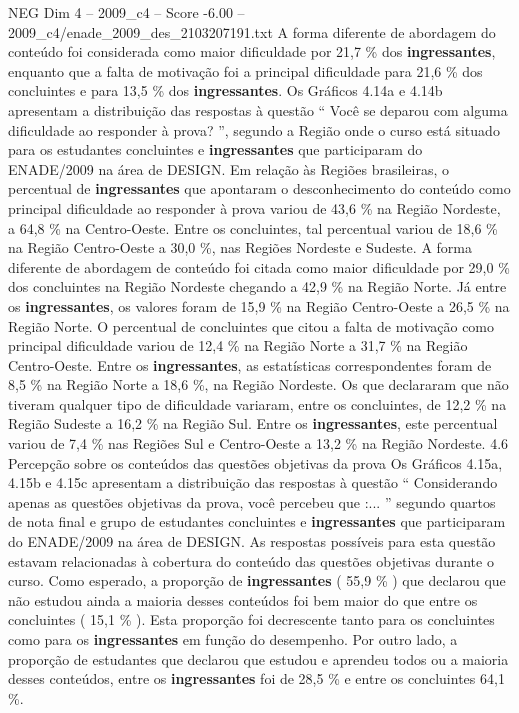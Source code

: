 \begin{textsample}{NEG Dim 4 – 2009\_c4 – Score -6.00 – 2009\_c4/enade\_2009\_des\_2103207191.txt}
A forma diferente de abordagem do conteúdo foi considerada como maior dificuldade por 21,7 \% dos \textbf{ingressantes}, enquanto que a falta de motivação foi a principal dificuldade para 21,6 \% dos concluintes e para 13,5 \% dos \textbf{ingressantes}.
Os Gráficos 4.14a e 4.14b apresentam a distribuição das respostas à questão “ Você se deparou com alguma dificuldade ao responder à prova? ”, segundo a Região onde o curso está situado para os estudantes concluintes e \textbf{ingressantes} que participaram do ENADE/2009 na área de DESIGN.
Em relação às Regiões brasileiras, o percentual de \textbf{ingressantes} que apontaram o desconhecimento do conteúdo como principal dificuldade ao responder à prova variou de 43,6 \% na Região Nordeste, a 64,8 \% na Centro-Oeste.
Entre os concluintes, tal percentual variou de 18,6 \% na Região Centro-Oeste a 30,0 \%, nas Regiões Nordeste e Sudeste.
A forma diferente de abordagem de conteúdo foi citada como maior dificuldade por 29,0 \% dos concluintes na Região Nordeste chegando a 42,9 \% na Região Norte.
Já entre os \textbf{ingressantes}, os valores foram de 15,9 \% na Região Centro-Oeste a 26,5 \% na Região Norte.
O percentual de concluintes que citou a falta de motivação como principal dificuldade variou de 12,4 \% na Região Norte a 31,7 \% na Região Centro-Oeste.
Entre os \textbf{ingressantes}, as estatísticas correspondentes foram de 8,5 \% na Região Norte a 18,6 \%, na Região Nordeste.
Os que declararam que não tiveram qualquer tipo de dificuldade variaram, entre os concluintes, de 12,2 \% na Região Sudeste a 16,2 \% na Região Sul.
Entre os \textbf{ingressantes}, este percentual variou de 7,4 \% nas Regiões Sul e Centro-Oeste a 13,2 \% na Região Nordeste. 4.6 Percepção sobre os conteúdos das questões objetivas da prova Os Gráficos 4.15a, 4.15b e 4.15c apresentam a distribuição das respostas à questão “ Considerando apenas as questões objetivas da prova, você percebeu que :... ” segundo quartos de nota final e grupo de estudantes concluintes e \textbf{ingressantes} que participaram do ENADE/2009 na área de DESIGN.
As respostas possíveis para esta questão estavam relacionadas à cobertura do conteúdo das questões objetivas durante o curso.
Como esperado, a proporção de \textbf{ingressantes} ( 55,9 \% ) que declarou que não estudou ainda a maioria desses conteúdos foi bem maior do que entre os concluintes ( 15,1 \% ).
Esta proporção foi decrescente tanto para os concluintes como para os \textbf{ingressantes} em função do desempenho.
Por outro lado, a proporção de estudantes que declarou que estudou e aprendeu todos ou a maioria desses conteúdos, entre os \textbf{ingressantes} foi de 28,5 \% e entre os concluintes 64,1 \%.

\end{textsample}

